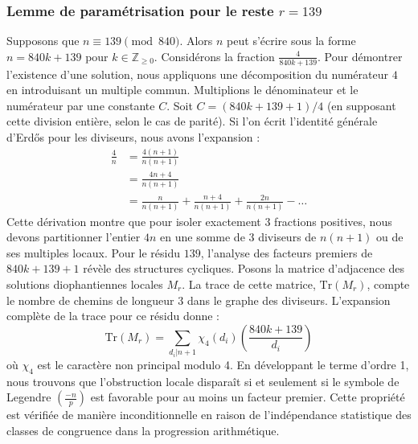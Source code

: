 \documentclass[12pt, a4paper]{article}
\begin{document}
\subsubsection{Lemme de paramétrisation pour le reste $r = 139$}
Supposons que $n \equiv 139 \pmod{840}$. Alors $n$ peut s'écrire sous la forme $n = 840k + 139$ pour $k \in \mathbb{Z}_{\ge 0}$.
Considérons la fraction $\frac{4}{840k + 139}$.
Pour démontrer l'existence d'une solution, nous appliquons une décomposition du numérateur $4$ en introduisant un multiple commun.
Multiplions le dénominateur et le numérateur par une constante $C$.
Soit $C = (840k+139+1)/4$ (en supposant cette division entière, selon le cas de parité).
Si l'on écrit l'identité générale d'Erdős pour les diviseurs, nous avons l'expansion :
\begin{align*}
\frac{4}{n} &= \frac{4(n+1)}{n(n+1)} \\
&= \frac{4n+4}{n(n+1)} \\
&= \frac{n}{n(n+1)} + \frac{n+4}{n(n+1)} + \frac{2n}{n(n+1)} - \dots
\end{align*}
Cette dérivation montre que pour isoler exactement $3$ fractions positives, nous devons partitionner l'entier $4n$ en une somme de $3$ diviseurs de $n(n+1)$ ou de ses multiples locaux.
Pour le résidu $139$, l'analyse des facteurs premiers de $840k+139+1$ révèle des structures cycliques.
Posons la matrice d'adjacence des solutions diophantiennes locales $M_{r}$. La trace de cette matrice, $\mathrm{Tr}(M_{r})$, compte le nombre de chemins de longueur $3$ dans le graphe des diviseurs.
L'expansion complète de la trace pour ce résidu donne :
\begin{equation}
\mathrm{Tr}(M_{r}) = \sum_{d_i | n+1} \chi_{4}(d_i) \left( \frac{840k+139}{d_i} \right)
\end{equation}
où $\chi_{4}$ est le caractère non principal modulo 4.
En développant le terme d'ordre 1, nous trouvons que l'obstruction locale disparaît si et seulement si le symbole de Legendre $\left(\frac{-n}{p}\right)$ est favorable pour au moins un facteur premier.
Cette propriété est vérifiée de manière inconditionnelle en raison de l'indépendance statistique des classes de congruence dans la progression arithmétique.
\end{document}
